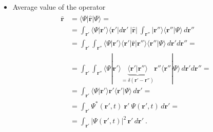 \documentclass[letterpaper,10pt,english]{jupyterBook}
\begin{document}
\begin{itemize}
\item {} 
\sphinxAtStartPar
Average value of the operator
\begin{equation*}
\begin{split}\begin{aligned}
  \bar{\mathbf{r}} & = \langle \Psi | \hat{\mathbf{r}} | \Psi \rangle = \\
  & = \int_{\mathbf{r}'} \langle \Psi | \mathbf{r}' \rangle \langle \mathbf{r}' | d \mathbf{r}' \ | \hat{\mathbf{r}} | \ \int_{\mathbf{r}''} | \mathbf{r}'' \rangle \langle \mathbf{r}'' | \Psi \rangle \, d \mathbf{r}'' \\
  & = \int_{\mathbf{r}'} \int_{\mathbf{r}''} \langle \Psi | \mathbf{r}' \rangle \langle \mathbf{r}' | \hat{\mathbf{r}} |  \mathbf{r}'' \rangle \langle \mathbf{r}'' | \Psi \rangle \, d \mathbf{r}'  d \mathbf{r}'' = \\
  & = \int_{\mathbf{r}'} \int_{\mathbf{r}''} \langle \Psi | \mathbf{r}' \rangle \underbrace{\langle \mathbf{r}' |  \mathbf{r}'' \rangle}_{=\delta(\mathbf{r}'-\mathbf{r}'')} \mathbf{r}'' \langle \mathbf{r}'' | \Psi \rangle \, d \mathbf{r}'  d \mathbf{r}'' = \\
  & = \int_{\mathbf{r}'} \langle \Psi | \mathbf{r}' \rangle \mathbf{r}' \langle \mathbf{r}' | \Psi \rangle \, d \mathbf{r}' = \\
  & = \int_{\mathbf{r}'} \Psi^*(\mathbf{r}',t) \ \mathbf{r}' \ \Psi(\mathbf{r}',t) \, d \mathbf{r}' = \\
  & = \int_{\mathbf{r}'}  \left| \Psi(\mathbf{r}',t) \right|^2 \, \mathbf{r}' \, d \mathbf{r}' \ .
  \end{aligned}\end{split}
\end{equation*}
\end{itemize}
\end{document}
